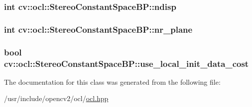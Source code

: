 \hypertarget{classcv_1_1ocl_1_1StereoConstantSpaceBP_aa03a1a80256f5a32e8ee084ab7c09e70}{
\subsubsection[{ndisp}]{\setlength{\rightskip}{0pt plus 5cm}int cv\-::ocl\-::\-Stereo\-Constant\-Space\-B\-P\-::ndisp}}\label{classcv_1_1ocl_1_1StereoConstantSpaceBP_aa03a1a80256f5a32e8ee084ab7c09e70}
\hypertarget{classcv_1_1ocl_1_1StereoConstantSpaceBP_af2c44af99c4a26c501a719567debef2f}{
\subsubsection[{nr\-\_\-plane}]{\setlength{\rightskip}{0pt plus 5cm}int cv\-::ocl\-::\-Stereo\-Constant\-Space\-B\-P\-::nr\-\_\-plane}}\label{classcv_1_1ocl_1_1StereoConstantSpaceBP_af2c44af99c4a26c501a719567debef2f}
\hypertarget{classcv_1_1ocl_1_1StereoConstantSpaceBP_a8185675416c0e703add4addffb0a7bd7}{
\subsubsection[{use\-\_\-local\-\_\-init\-\_\-data\-\_\-cost}]{\setlength{\rightskip}{0pt plus 5cm}bool cv\-::ocl\-::\-Stereo\-Constant\-Space\-B\-P\-::use\-\_\-local\-\_\-init\-\_\-data\-\_\-cost}}\label{classcv_1_1ocl_1_1StereoConstantSpaceBP_a8185675416c0e703add4addffb0a7bd7}


The documentation for this class was generated from the following file\-:\begin{DoxyCompactItemize}
\item 
/usr/include/opencv2/ocl/\hyperlink{ocl_2ocl_8hpp}{ocl.\-hpp}\end{DoxyCompactItemize}
